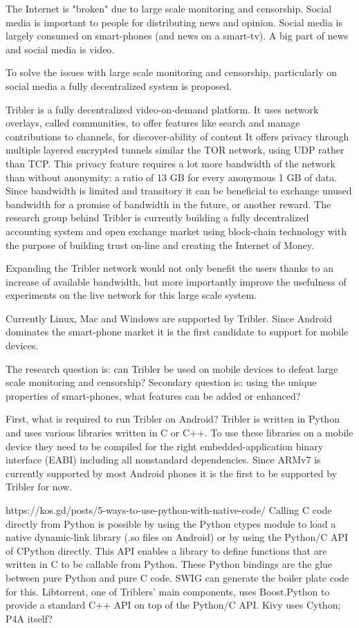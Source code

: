 The Internet is "broken" due to large scale monitoring and censorship.
Social media is important to people for distributing news and opinion.
Social media is largely consumed on smart-phones (and news on a smart-tv).
A big part of news and social media is video.

To solve the issues with large scale monitoring and censorship, particularly on social media a fully decentralized system is proposed.

Tribler is a fully decentralized video-on-demand platform.
It uses network overlays, called communities, to offer features like search and manage contributions to channels, for discover-ability of content
It offers privacy through multiple layered encrypted tunnels similar the TOR network, using UDP rather than TCP.
This privacy feature requires a lot more bandwidth of the network than without anonymity: a ratio of 13 GB for every anonymous 1 GB of data.
Since bandwidth is limited and transitory it can be beneficial to exchange unused bandwidth for a promise of bandwidth in the future, or another reward.
The research group behind Tribler is currently building a fully decentralized accounting system and open exchange market using block-chain technology with the purpose of building trust on-line and creating the Internet of Money.

Expanding the Tribler network would not only benefit the users thanks to an increase of available bandwidth, but more importantly improve the usefulness of experiments on the live network for this large scale system.

Currently Linux, Mac and Windows are supported by Tribler. 
Since Android dominates the smart-phone market it is the first candidate to support for mobile devices.


The research question is: can Tribler be used on mobile devices to defeat large scale monitoring and censorship?
Secondary question is: using the unique properties of smart-phones, what features can be added or enhanced?

First, what is required to run Tribler on Android?
Tribler is written in Python and uses various libraries written in C or C++.
To use these libraries on a mobile device they need to be compiled for the right embedded-application binary interface (EABI) including all nonstandard dependencies.
Since ARMv7 is currently supported by most Android phones it is the first to be supported by Tribler for now.


https://kos.gd/posts/5-ways-to-use-python-with-native-code/
Calling C code directly from Python is possible by using the Python ctypes module to load a native dynamic-link library (.so files on Android) or by using the Python/C API of CPython directly.
This API enables a library to define functions that are written in C to be callable from Python.
These Python bindings are the glue between pure Python and pure C code.
SWIG can generate the boiler plate code for this.
Libtorrent, one of Triblers' main components, uses Boost.Python to provide a standard C++ API on top of the Python/C API.
Kivy uses Cython; P4A itself?

